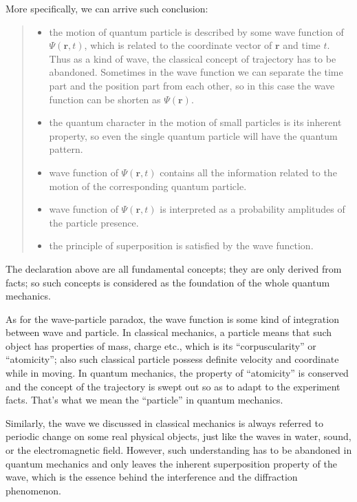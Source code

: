 More specifically, we can arrive such conclusion:
\begin{center}
  \begin{quote}
    \begin{itemize}
    \item the motion of quantum particle is described by some wave
      function of $\Psi(\bm{r},t)$, which is related to the coordinate
      vector of $\bm{r}$ and time $t$. Thus as a kind of wave, the
      classical concept of trajectory has to be abandoned. Sometimes
      in the wave function we can separate the time part and the
      position part from each other, so in this case the wave function
      can be shorten as $\Psi(\bm{r})$.
    \item the quantum character in the motion of small particles is
      its inherent property, so even the single quantum particle will
      have the quantum pattern.
    \item wave function of $\Psi(\bm{r},t)$ contains all the
      information related to the motion of the corresponding quantum
      particle.
    \item wave function of $\Psi(\bm{r},t)$ is interpreted as a
      probability amplitudes of the particle presence.
    \item the principle of superposition is satisfied by the wave
      function.
\end{itemize}
    \end{quote}
\end{center}

The declaration above are all fundamental concepts; they are only
derived from facts; so such concepts is considered as the foundation
of the whole quantum mechanics.

As for the wave-particle paradox, the wave function is some kind of
integration between wave and particle. In classical mechanics, a
particle means that such object has properties of mass, charge etc.,
which is its ``corpuscularity'' or ``atomicity''; also such classical
particle possess definite velocity and coordinate while in moving. In
quantum mechanics, the property of ``atomicity'' is conserved and the
concept of the trajectory is swept out so as to adapt to the
experiment facts. That's what we mean the ``particle'' in quantum
mechanics.

Similarly, the wave we discussed in classical mechanics is always
referred to periodic change on some real physical objects, just like
the waves in water, sound, or the electromagnetic field. However, such
understanding has to be abandoned in quantum mechanics and only leaves
the inherent superposition property of the wave, which is the essence
behind the interference and the diffraction phenomenon.

